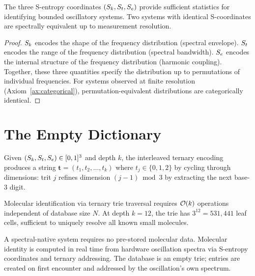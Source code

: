 \begin{theorem}
\label{thm:sufficiency}
The three S-entropy coordinates $(S_k, S_t, S_e)$ provide sufficient statistics for identifying bounded oscillatory systems. Two systems with identical S-coordinates are spectrally equivalent up to measurement resolution.
\end{theorem}

\begin{proof}
$S_k$ encodes the shape of the frequency distribution (spectral envelope). $S_t$ encodes the range of the frequency distribution (spectral bandwidth). $S_e$ encodes the internal structure of the frequency distribution (harmonic coupling). Together, these three quantities specify the distribution up to permutations of individual frequencies. For systems observed at finite resolution (Axiom~\ref{ax:categorical}), permutation-equivalent distributions are categorically identical.
\end{proof}

\section{The Empty Dictionary}
\label{sec:empty_dict}

\begin{definition}
\label{def:ternary}
Given $(S_k, S_t, S_e) \in [0,1]^3$ and depth $k$, the interleaved ternary encoding produces a string $\mathbf{t} = (t_1, t_2, \ldots, t_k)$ where $t_j \in \{0, 1, 2\}$ by cycling through dimensions: trit $j$ refines dimension $(j-1) \bmod 3$ by extracting the next base-3 digit.
\end{definition}

\begin{theorem}[O(k) Lookup]
\label{thm:lookup}
Molecular identification via ternary trie traversal requires $\mathcal{O}(k)$ operations independent of database size $N$. At depth $k = 12$, the trie has $3^{12} = 531{,}441$ leaf cells, sufficient to uniquely resolve all known small molecules.
\end{theorem}

\begin{definition}
\label{def:empty_dict}
A spectral-native system requires no pre-stored molecular data. Molecular identity is computed in real time from hardware oscillation spectra via S-entropy coordinates and ternary addressing. The database is an empty trie; entries are created on first encounter and addressed by the oscillation's own spectrum.
\end{definition}

